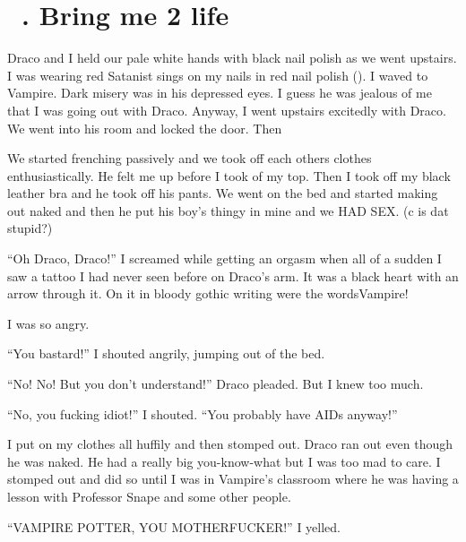 \section{\chaptername~\thesection. Bring me 2 life}



Draco and I held our pale white hands with black nail polish as we went upstairs. I was wearing red Satanist sings on my nails in red nail polish (). I waved to Vampire. Dark misery was in his depressed eyes. I guess he was jealous of me that I was going out with Draco. Anyway, I went upstairs excitedly with Draco. We went into his room and locked the door. Then\dotfill

\begin{sloppypar}
    We started frenching passively and we took off each others clothes enthusiastically. He felt me up before I took of my top. Then I took off my black leather bra and he took off his pants. We went on the bed and started making out naked and then he put his boy's thingy in mine and we HAD SEX\@. (c is dat stupid?)
\end{sloppypar}

\enquote{Oh Draco, Draco!} I screamed while getting an orgasm when all of a sudden I saw a tattoo I had never seen before on Draco's arm. It was a black heart with an arrow through it. On it in bloody gothic writing were the words\dotfill Vampire!

I was so angry.

\enquote{You bastard!} I shouted angrily, jumping out of the bed.

\enquote{No! No! But you don't understand!} Draco pleaded. But I knew too much.

\enquote{No, you fucking idiot!} I shouted. \enquote{You probably have AIDs anyway!}

I put on my clothes all huffily and then stomped out. Draco ran out even though he was naked. He had a really big you-know-what but I was too mad to care. I stomped out and did so until I was in Vampire's classroom where he was having a lesson with Professor Snape and some other people.

\enquote{VAMPIRE POTTER, YOU MOTHERFUCKER!} I yelled.
